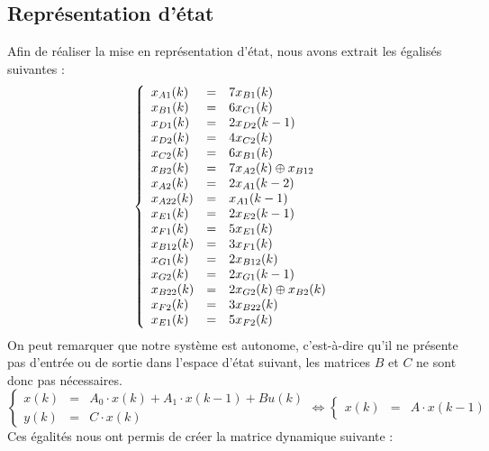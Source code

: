 \subsection{Représentation d'état}
Afin de réaliser la mise en représentation d'état, nous avons extrait les égalisés suivantes :
\begin{align*}
\left\lbrace
\begin{array}{l c l}
x_{A1}(k) &=&	7x_{B1}(k)\\ 
x_{B1}(k) &=&	6x_{C1}(k)\\
x_{D1}(k) &=&	2x_{D2}(k-1)\\
x_{D2}(k) &=&	4x_{C2}(k)\\
x_{C2}(k) &=&	6x_{B1}(k)\\
x_{B2}(k) &=&	7x_{A2}(k) \oplus x_{B12}\\
x_{A2}(k) &=&	2x_{A1}(k-2)\\
x_{A22}(k) &=&	x_{A1}(k-1)\\
x_{E1}(k) &=&	2x_{E2}(k-1)\\
x_{F1}(k) &=&	5x_{E1}(k)\\
x_{B12}(k) &=&	3x_{F1}(k)\\
x_{G1}(k) &=&	2x_{B12}(k)\\
x_{G2}(k) &=&	2x_{G1}(k-1)\\
x_{B22}(k) &=&	2x_{G2}(k) \oplus x_{B2}(k)\\
x_{F2}(k) &=&	3x_{B22}(k)\\
x_{E1}(k) &=&	5x_{F2}(k)   \\  
\end{array}
\right.
\end{align*}
On peut remarquer que notre système est autonome, c'est-à-dire qu'il ne présente pas d'entrée ou de sortie 
dans l'espace d'état suivant, les matrices $B$ et $C$ ne sont donc pas nécessaires.
\begin{equation}
\left\lbrace
\begin{array}{lcl}
	x(k) &=& A_0 \cdot x(k) + A_1 \cdot x(k-1) + B u(k)\\
	y(k) &=& C \cdot x(k)
\end{array}
\right. \Leftrightarrow
\left\lbrace\begin{array}{lcl}
	x(k) &=& A \cdot x(k-1)
\end{array}\right.
\end{equation}
Ces égalités nous ont permis de créer la matrice dynamique suivante : 

